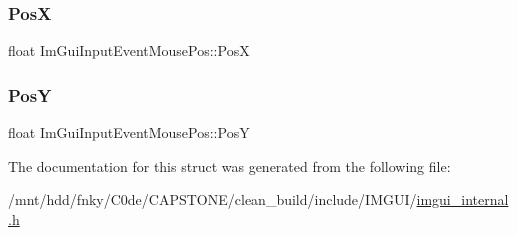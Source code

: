 \subsubsection{\texorpdfstring{PosX}{PosX}}
{\footnotesize\ttfamily float Im\+Gui\+Input\+Event\+Mouse\+Pos\+::\+PosX}

\mbox{\label{structImGuiInputEventMousePos_a515eb4e5c6cb604fabdb26dc99d14c6f}} 
\subsubsection{\texorpdfstring{PosY}{PosY}}
{\footnotesize\ttfamily float Im\+Gui\+Input\+Event\+Mouse\+Pos\+::\+PosY}



The documentation for this struct was generated from the following file\+:\begin{DoxyCompactItemize}
\item 
/mnt/hdd/fnky/\+C0de/\+C\+A\+P\+S\+T\+O\+N\+E/clean\+\_\+build/include/\+I\+M\+G\+U\+I/\hyperlink{imgui__internal_8h}{imgui\+\_\+internal.\+h}\end{DoxyCompactItemize}
